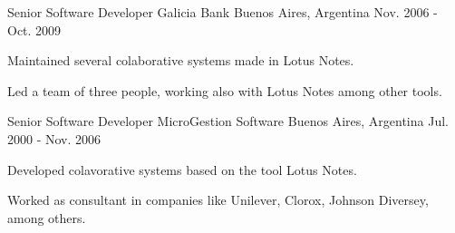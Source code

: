 \begin{cventries}
  \cventry
    {Senior Software Developer} %
    {Galicia Bank} %
    {Buenos Aires, Argentina} %
    {Nov. 2006 - Oct. 2009} %
    {
      \begin{cvitems} %
        \item {Maintained several colaborative systems made in Lotus Notes.}
        \item {Led a team of three people, working also with Lotus Notes among other tools.}
      \end{cvitems}
    }

  \cventry
    {Senior Software Developer} %
    {MicroGestion Software} %
    {Buenos Aires, Argentina} %
    {Jul. 2000 - Nov. 2006} %
    {
      \begin{cvitems} %
        \item {Developed colavorative systems based on the tool Lotus Notes.}
        \item {Worked as consultant in companies like Unilever, Clorox, Johnson Diversey, among others.}
      \end{cvitems}
    }

\end{cventries}
